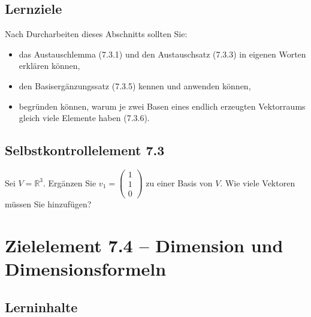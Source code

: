 \documentclass[a4paper,12pt]{article}
\begin{document}
\subsection*{Lernziele}

Nach Durcharbeiten dieses Abschnitts sollten Sie:
\begin{itemize}
  \item das Austauschlemma (7.3.1) und den Austauschsatz (7.3.3) in eigenen
        Worten erklären können,
  \item den Basisergänzungssatz (7.3.5) kennen und anwenden können,
  \item begründen können, warum je zwei Basen eines endlich erzeugten
        Vektorraums gleich viele Elemente haben (7.3.6).
\end{itemize}

\subsection*{Selbstkontrollelement 7.3}

Sei $V = \mathbb{R}^3$. Ergänzen Sie $v_1 = \begin{pmatrix}1\\1\\0\end{pmatrix}$
zu einer Basis von $V$. Wie viele Vektoren müssen Sie hinzufügen?

\newpage

\section*{Zielelement 7.4 -- Dimension und Dimensionsformeln}

\subsection*{Lerninhalte}

\begin{center}
\end{center}
\end{document}
